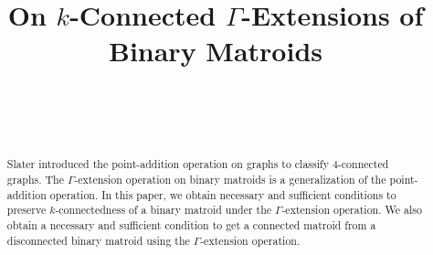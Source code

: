 \documentclass[
11pt,%
tightenlines,%
twoside,%
onecolumn,%
nofloats,%
nobibnotes,%
nofootinbib,%
superscriptaddress,%
noshowpacs,%
centertags]%
{revtex4}
\begin{document}

\title{On $k$-Connected $\Gamma$-Extensions of Binary Matroids}

\author{~}
\author{~}




\begin{abstract}
Slater introduced the  point-addition operation on graphs to classify 4-connected graphs. The $\Gamma$-extension operation on binary matroids is a  generalization of  the point-addition operation. In this paper, we obtain necessary and sufficient conditions to preserve $k$-connectedness of a binary matroid under the $\Gamma$-extension operation. We also obtain a necessary and sufficient condition to get a connected  matroid  from a disconnected binary matroid using the  $\Gamma$-extension operation.

\end{abstract}



\maketitle

\end{document}
